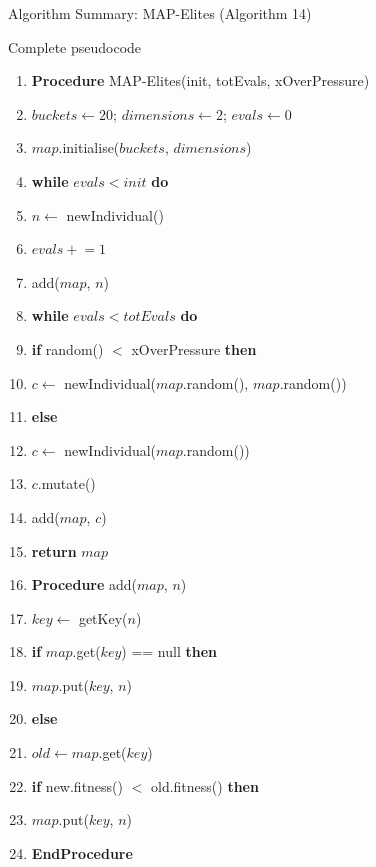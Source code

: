\documentclass[aspectratio=169,10pt]{beamer}
\begin{document}
\begin{frame}[allowframebreaks]{Algorithm Summary: MAP-Elites (Algorithm 14)}

\begin{block}{Complete pseudocode}
\begin{enumerate}
  \item[] \textbf{Procedure} MAP-Elites(init, totEvals, xOverPressure)
  \item $buckets \leftarrow 20$; \quad $dimensions \leftarrow 2$; \quad $evals \leftarrow 0$
  \item $map$.initialise($buckets$, $dimensions$)
  \item[] \textbf{while} $evals < init$ \textbf{do}
  \item \quad $n \leftarrow$ newIndividual()
  \item \quad $evals \mathrel{+}= 1$
  \item \quad add($map$, $n$)
  \item[] \textbf{while} $evals < totEvals$ \textbf{do}
  \item \quad \textbf{if} random() $<$ xOverPressure \textbf{then}
  \item \quad\quad $c \leftarrow$ newIndividual($map$.random(), $map$.random())
  \item \quad \textbf{else}
  \item \quad\quad $c \leftarrow$ newIndividual($map$.random())
  \item \quad $c$.mutate()
  \item \quad add($map$, $c$)
  \item[] \textbf{return} $map$
  \item[] \textbf{Procedure} add($map$, $n$)
  \item $key \leftarrow$ getKey($n$)
  \item \textbf{if} $map$.get($key$) == null \textbf{then}
  \item \quad $map$.put($key$, $n$)
  \item \textbf{else}
  \item \quad $old \leftarrow map$.get($key$)
  \item \quad \textbf{if} new.fitness() $<$ old.fitness() \textbf{then}
  \item \quad\quad $map$.put($key$, $n$)
  \item[] \textbf{EndProcedure}
\end{enumerate}
\end{block}

\end{frame}
\end{document}
